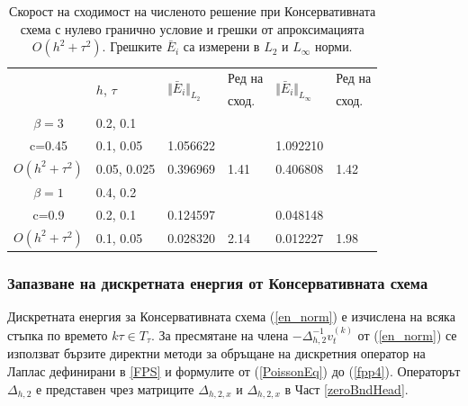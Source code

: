 \documentclass[a4paper]{article}
\newcommand{\rf}[1]{(\ref{#1})}
\theoremstyle{remark}
\begin{document}
\begin{large}
\begin{table}[ht]
\centering
\small
		\begin{tabular}{||c|l|ll|ll||}
			\hline
			\hline
      \multirow{2  }{*}{ }        & \multirow{2  }{*}{$h$, $\tau$}  &	\multirow{2  }{*}{  $\Vert \bar E_i \Vert_{L_2} $ } 	&Ред на & \multirow{2  }{*}{  $\Vert \bar E_i \Vert_{L_\infty}$ }	&Ред на   \\
	                                        &                                                &    										&  сход. & 										& сход. \\
   			\hline 
					\hline 
  $\beta=3$                 &0.2, 0.1          &                 &                &                  &                   \\
   c=0.45                     &0.1, 0.05       & 1.056622   &                & 1.092210 &                   \\
     $O(h^2 + \tau^ 2)$ &0.05, 0.025  & 0.396969    	& 1.41       	& 0.406808   &   1.42   \\
	   \hline
			\hline 
       $\beta=1$           & 0.4, 0.2       &                   &           &                 &   \\
                  c=0.9       & 0.2, 0.1        & 0.124597   &          &0.048148  &   \\
  $O(h^2+ \tau^2)$  & 0.1, 0.05       & 0.028320   & 2.14  &0.012227  & 1.98 \\
	   \hline
			\hline 
		\end{tabular}
		\caption{Скорост на сходимост на численото решение при Консервативната схема с нулево гранично условие и грешки от апроксимацията $O(h^{2} + \tau^2 )$. Грешките $\bar E_i$ са измерени в $L_2$ и $L_\infty$ норми.}
\label{tableC}
\end{table}

\subsubsection{ Запазване на дискретната енергия от Консервативната схема}\label{enCons}
Дискретната енергия за Консервативната схема \rf{en_norm} е изчислена на всяка стъпка по времето $k \tau \in T_\tau$. За пресмятане на члена $-\Delta_{h,2}^{-1}v_{t}^{(k)}$ от \rf{en_norm} се използват бързите директни методи за обръщане на дискретния оператор на Лаплас дефинирани в \ref{FPS} и формулите от \rf{PoissonEq} до \rf{fpp4}. Операторът $\Delta_{h,2}$ е представен чрез матриците $\Delta_{h,2,x}$ и $\Delta_{h,2,x}$ в Част \ref{zeroBndHead}.


\end{large}
\end{document}
